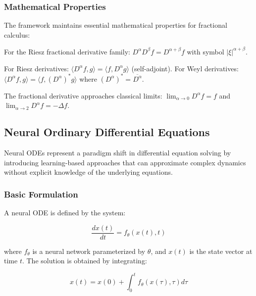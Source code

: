 \subsubsection{Mathematical Properties}

The framework maintains essential mathematical properties for fractional calculus:

\begin{theorem}
For the Riesz fractional derivative family: $D^\alpha D^\beta f = D^{\alpha+\beta} f$ with symbol $|\xi|^{\alpha+\beta}$.
\end{theorem}

\begin{theorem}
For Riesz derivatives: $\langle D^\alpha f, g \rangle = \langle f, D^\alpha g \rangle$ (self-adjoint).
For Weyl derivatives: $\langle D^\alpha f, g \rangle = \langle f, (D^\alpha)^* g \rangle$ where $(D^\alpha)^* = \overline{D^\alpha}$.
\end{theorem}

\begin{theorem}
The fractional derivative approaches classical limits: $\lim_{\alpha \to 0} D^\alpha f = f$ and $\lim_{\alpha \to 2} D^\alpha f = -\Delta f$.
\end{theorem}

\subsection{Neural Ordinary Differential Equations}

Neural ODEs represent a paradigm shift in differential equation solving by introducing learning-based approaches that can approximate complex dynamics without explicit knowledge of the underlying equations.

\subsubsection{Basic Formulation}

A neural ODE is defined by the system:

\begin{equation}
\frac{dx(t)}{dt} = f_\theta(x(t), t)
\end{equation}

where $f_\theta$ is a neural network parameterized by $\theta$, and $x(t)$ is the state vector at time $t$. The solution is obtained by integrating:

\begin{equation}
x(t) = x(0) + \int_0^t f_\theta(x(\tau), \tau) d\tau
\end{equation}

